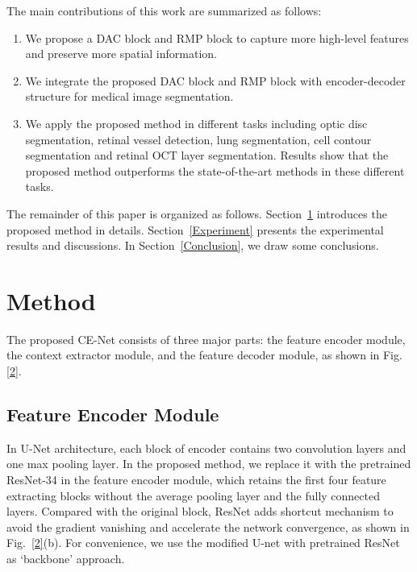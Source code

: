 \documentclass[journal]{IEEEtran}
\begin{document}
The main contributions of this work are summarized as follows:
	
\begin{enumerate}

\item{We propose a DAC block and RMP block to capture more high-level features and preserve more spatial information.}

\item{We integrate the proposed DAC block and RMP block with encoder-decoder structure for medical image segmentation.  }

 

\item{We apply the proposed method in different tasks including optic disc segmentation, retinal vessel detection, lung segmentation, cell contour segmentation and retinal OCT layer segmentation. Results show that the proposed method outperforms the state-of-the-art methods in these different tasks.  }
\end{enumerate}

The remainder of this paper is organized as follows. Section~\ref{Method} introduces the proposed method in details. Section~\ref{Experiment} presents the experimental results and discussions. In Section~\ref{Conclusion}, we draw some conclusions.



\section{Method}
\label{Method}
The proposed CE-Net consists of three major parts: the feature encoder module, the context extractor module, and the feature decoder module, as shown in Fig. \ref{2}.  

\subsection{Feature Encoder Module}

In U-Net architecture, each block of encoder contains two convolution layers and one max pooling layer. In the proposed method, we replace it with the pretrained ResNet-34 \cite{he2016deep} in the feature encoder module, which retains the first four feature extracting blocks without the average pooling layer and the fully connected layers. Compared with the original block, ResNet adds shortcut mechanism to avoid the gradient vanishing and accelerate the network convergence, as shown in Fig.~\ref{2}(b). For convenience, we use the modified U-net with pretrained ResNet as ‘backbone’ approach. 
\end{document}
